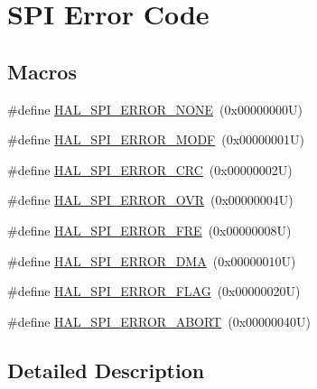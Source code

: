 \hypertarget{group___s_p_i___error___code}{}\section{S\+PI Error Code}
\label{group___s_p_i___error___code}
\subsection*{Macros}
\begin{DoxyCompactItemize}
\item 
\#define \mbox{\hyperlink{group___s_p_i___error___code_gaac0006cdf5670741f8702e55d4bf4601}{H\+A\+L\+\_\+\+S\+P\+I\+\_\+\+E\+R\+R\+O\+R\+\_\+\+N\+O\+NE}}~(0x00000000\+U)
\item 
\#define \mbox{\hyperlink{group___s_p_i___error___code_ga75f5edd4e2a7a95bc9a994244df52460}{H\+A\+L\+\_\+\+S\+P\+I\+\_\+\+E\+R\+R\+O\+R\+\_\+\+M\+O\+DF}}~(0x00000001\+U)
\item 
\#define \mbox{\hyperlink{group___s_p_i___error___code_gad1163823ec5fa89e4670366565d4ab93}{H\+A\+L\+\_\+\+S\+P\+I\+\_\+\+E\+R\+R\+O\+R\+\_\+\+C\+RC}}~(0x00000002\+U)
\item 
\#define \mbox{\hyperlink{group___s_p_i___error___code_ga9587f998fed196a4f30c38f2da731c0f}{H\+A\+L\+\_\+\+S\+P\+I\+\_\+\+E\+R\+R\+O\+R\+\_\+\+O\+VR}}~(0x00000004\+U)
\item 
\#define \mbox{\hyperlink{group___s_p_i___error___code_gaf03238e57dd0c4d277fef2aa7a083133}{H\+A\+L\+\_\+\+S\+P\+I\+\_\+\+E\+R\+R\+O\+R\+\_\+\+F\+RE}}~(0x00000008\+U)
\item 
\#define \mbox{\hyperlink{group___s_p_i___error___code_gaaf91992131301e3fc7f2ce62fb011f6c}{H\+A\+L\+\_\+\+S\+P\+I\+\_\+\+E\+R\+R\+O\+R\+\_\+\+D\+MA}}~(0x00000010\+U)
\item 
\#define \mbox{\hyperlink{group___s_p_i___error___code_ga777b36b52caf926a384976baf34530a3}{H\+A\+L\+\_\+\+S\+P\+I\+\_\+\+E\+R\+R\+O\+R\+\_\+\+F\+L\+AG}}~(0x00000020\+U)
\item 
\#define \mbox{\hyperlink{group___s_p_i___error___code_gab7fa15838d5ef9316ed8a0ec1c782fb7}{H\+A\+L\+\_\+\+S\+P\+I\+\_\+\+E\+R\+R\+O\+R\+\_\+\+A\+B\+O\+RT}}~(0x00000040\+U)
\end{DoxyCompactItemize}


\subsection{Detailed Description}


